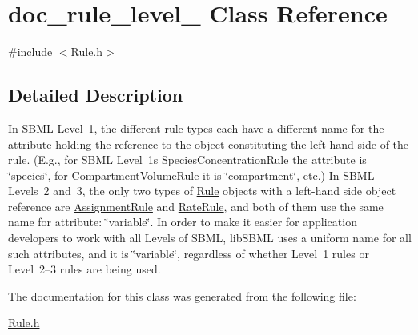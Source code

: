 \hypertarget{classdoc__rule__level__1}{}\section{doc\+\_\+rule\+\_\+level\+\_ Class Reference}
\label{classdoc__rule__level__1}


{\ttfamily \#include $<$Rule.\+h$>$}



\subsection{Detailed Description}
\begin{DoxyParagraph}{}
In S\+B\+ML Level~1, the different rule types each have a different name for the attribute holding the reference to the object constituting the left-\/hand side of the rule. (E.\+g., for S\+B\+ML Level~1\textquotesingle{}s Species\+Concentration\+Rule the attribute is \char`\"{}species\char`\"{}, for Compartment\+Volume\+Rule it is \char`\"{}compartment\char`\"{}, etc.) In S\+B\+ML Levels~2 and~3, the only two types of \hyperlink{class_rule}{Rule} objects with a left-\/hand side object reference are \hyperlink{class_assignment_rule}{Assignment\+Rule} and \hyperlink{class_rate_rule}{Rate\+Rule}, and both of them use the same name for attribute\+: \char`\"{}variable\char`\"{}. In order to make it easier for application developers to work with all Levels of S\+B\+ML, lib\+S\+B\+ML uses a uniform name for all such attributes, and it is \char`\"{}variable\char`\"{}, regardless of whether Level~1 rules or Level~2--3 rules are being used. 
\end{DoxyParagraph}


The documentation for this class was generated from the following file\+:\begin{DoxyCompactItemize}
\item 
\hyperlink{_rule_8h}{Rule.\+h}\end{DoxyCompactItemize}
